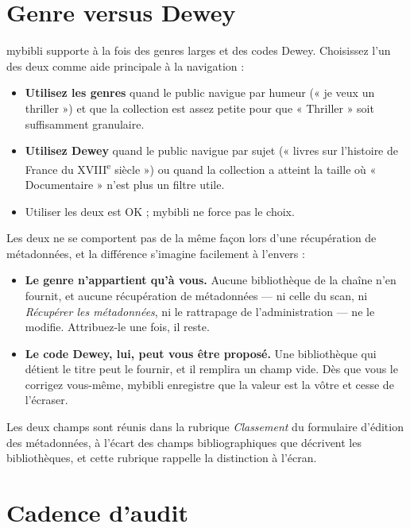 \section{Genre versus Dewey}

mybibli supporte à la fois des genres larges et des codes
Dewey. Choisissez l'un des deux comme aide principale
à la navigation :

\begin{itemize}
  \item \textbf{Utilisez les genres} quand le public navigue par
        humeur (« je veux un thriller ») et que la collection est
        assez petite pour que « Thriller » soit suffisamment
        granulaire.
  \item \textbf{Utilisez Dewey} quand le public navigue par sujet
        (« livres sur l'histoire de France du XVIII\textsuperscript{e}
        siècle ») ou quand la collection a atteint la taille où
        « Documentaire » n'est plus un filtre utile.
  \item Utiliser les deux est OK ; mybibli ne force pas le choix.
\end{itemize}

Les deux ne se comportent pas de la même façon lors d'une récupération
de métadonnées, et la différence s'imagine facilement à l'envers :

\begin{itemize}
  \item \textbf{Le genre n'appartient qu'à vous.} Aucune bibliothèque
        de la chaîne n'en fournit, et aucune récupération de
        métadonnées \string— ni celle du scan, ni
        \emph{Récupérer les métadonnées}, ni le rattrapage de
        l'administration \string— ne le modifie. Attribuez-le une fois,
        il reste.
  \item \textbf{Le code Dewey, lui, peut vous être proposé.} Une
        bibliothèque qui détient le titre peut le fournir, et il
        remplira un champ vide. Dès que vous le corrigez vous-même,
        mybibli enregistre que la valeur est la vôtre et cesse de
        l'écraser.
\end{itemize}

Les deux champs sont réunis dans la rubrique \emph{Classement} du
formulaire d'édition des métadonnées, à l'écart des champs
bibliographiques que décrivent les bibliothèques, et cette rubrique
rappelle la distinction à l'écran.

\section{Cadence d'audit}

